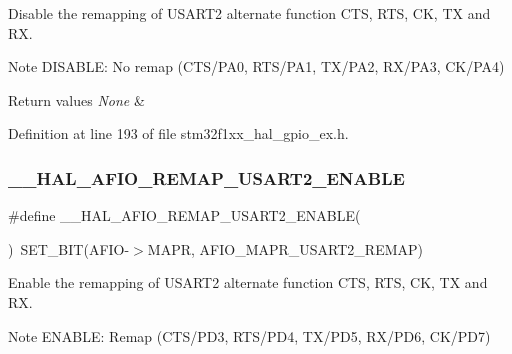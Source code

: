 Disable the remapping of U\+S\+A\+R\+T2 alternate function C\+TS, R\+TS, CK, TX and RX. 

\begin{DoxyNote}{Note}
D\+I\+S\+A\+B\+LE\+: No remap (C\+T\+S/\+P\+A0, R\+T\+S/\+P\+A1, T\+X/\+P\+A2, R\+X/\+P\+A3, C\+K/\+P\+A4) 
\end{DoxyNote}

\begin{DoxyRetVals}{Return values}
{\em None} & \\
\hline
\end{DoxyRetVals}


Definition at line 193 of file stm32f1xx\+\_\+hal\+\_\+gpio\+\_\+ex.\+h.

\mbox{\label{group___g_p_i_o_ex___a_f_i_o___a_f___r_e_m_a_p_p_i_n_g_gaed981d1451f0a7514a57d9d7a90fba04}} 
\subsubsection{\texorpdfstring{\+\_\+\+\_\+\+H\+A\+L\+\_\+\+A\+F\+I\+O\+\_\+\+R\+E\+M\+A\+P\+\_\+\+U\+S\+A\+R\+T2\+\_\+\+E\+N\+A\+B\+LE}{\_\_HAL\_AFIO\_REMAP\_USART2\_ENABLE}}
{\footnotesize\ttfamily \#define \+\_\+\+\_\+\+H\+A\+L\+\_\+\+A\+F\+I\+O\+\_\+\+R\+E\+M\+A\+P\+\_\+\+U\+S\+A\+R\+T2\+\_\+\+E\+N\+A\+B\+LE(\begin{DoxyParamCaption}{ }\end{DoxyParamCaption})~S\+E\+T\+\_\+\+B\+IT(A\+F\+IO-\/$>$M\+A\+PR, A\+F\+I\+O\+\_\+\+M\+A\+P\+R\+\_\+\+U\+S\+A\+R\+T2\+\_\+\+R\+E\+M\+AP)}



Enable the remapping of U\+S\+A\+R\+T2 alternate function C\+TS, R\+TS, CK, TX and RX. 

\begin{DoxyNote}{Note}
E\+N\+A\+B\+LE\+: Remap (C\+T\+S/\+P\+D3, R\+T\+S/\+P\+D4, T\+X/\+P\+D5, R\+X/\+P\+D6, C\+K/\+P\+D7) 
\end{DoxyNote}

